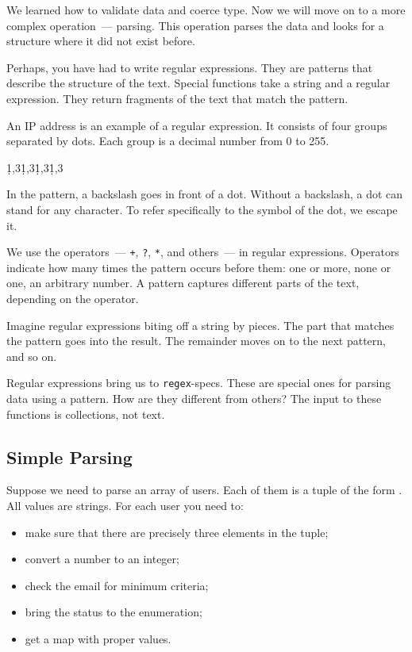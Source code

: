 We learned how to validate data and coerce type. Now we will move on to a more complex operation~--- parsing. This operation parses the data and looks for a structure where it did not exist before.

Perhaps, you have had to write regular expressions. They are patterns that describe the structure of the text. Special functions take a string and a regular expression. They return fragments of the text that match the pattern.

An IP address is an example of a regular expression. It consists of four groups separated by dots. Each group is a decimal number from 0 to 255.


\begin{english}
  \begin{text}
\d{1,3}\.\d{1,3}\.\d{1,3}\.\d{1,3}
  \end{text}
\end{english}

In the pattern, a backslash goes in front of a dot. Without a backslash, a dot can stand for any character. To refer specifically to the symbol of the dot, we escape it.

We use the operators~--- \verb|+|, \verb|?|, \verb|*|, and others~--- in regular expressions. Operators indicate how many times the pattern occurs before them: one or more, none or one, an arbitrary number. A pattern captures different parts of the text, depending on the operator.

Imagine regular expressions biting off a string by pieces. The part that matches the pattern goes into the result. The remainder moves on to the next pattern, and so on.

Regular expressions bring us to \verb|regex|-specs. These are special ones for parsing data using a pattern. How are they different from others? The input to these functions is collections, not text.


\subsection{Simple Parsing}

Suppose we need to parse an array of users. Each of them is a tuple of the form . All values are strings. For each user you need to:

\begin{itemize}

\item
  make sure that there are precisely three elements in the tuple;

\item
  convert a number to an integer;

\item
  check the email for minimum criteria;

\item
  bring the status to the enumeration;

\item
  get a map with proper values.

\end{itemize}

